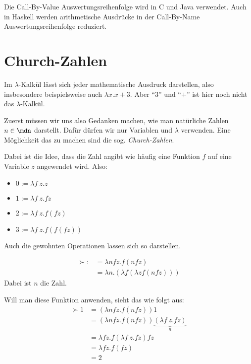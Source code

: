 Die Call-By-Value Auswertungsreihenfolge wird in C und Java verwendet.
Auch in Haskell werden arithmetische Ausdrücke in der Call-By-Name Auswertungsreihenfolge reduziert.

\section{Church-Zahlen}
Im $\lambda$-Kalkül lässt sich jeder mathematische Ausdruck darstellen, also 
insbesondere beispielsweise auch $\lambda x. x+3$. Aber \enquote{$3$} und
\enquote{$+$} ist hier noch nicht das $\lambda$-Kalkül.

Zuerst müssen wir uns also Gedanken machen, wie man natürliche Zahlen $n \in \mdn$
darstellt. Dafür dürfen wir nur Variablen und $\lambda$ verwenden. Eine Möglichkeit
das zu machen sind die sog. \textit{Church-Zahlen}.

Dabei ist die Idee, dass die Zahl angibt wie häufig eine Funktion $f$ auf eine
Variable $z$ angewendet wird. Also:
\begin{itemize}
    \item $0 := \lambda f~z. z$
    \item $1 := \lambda f~z. f z$
    \item $2 := \lambda f~z. f (f z)$
    \item $3 := \lambda f~z. f (f (f z))$
\end{itemize}

Auch die gewohnten Operationen lassen sich so darstellen.

\begin{beispiel}
    \begin{align*}
        \succ :&= \lambda n f z. f (n f z)\\
               &= \lambda n. (\lambda f  (\lambda z f (n f z)))
    \end{align*}
    Dabei ist $n$ die Zahl. 

    Will man diese Funktion anwenden, sieht das wie folgt aus:
    \begin{align*}
    \succ 1&= (\lambda n f z. f(n f z)) 1\\
           &= (\lambda n f z. f(n f z)) \underbrace{(\lambda f~z. f z)}_{n}\\
           &= \lambda f z. f (\lambda f~z. f z) f z\\
           &= \lambda f z. f (f z)\\
           &= 2
    \end{align*}
\end{beispiel}

